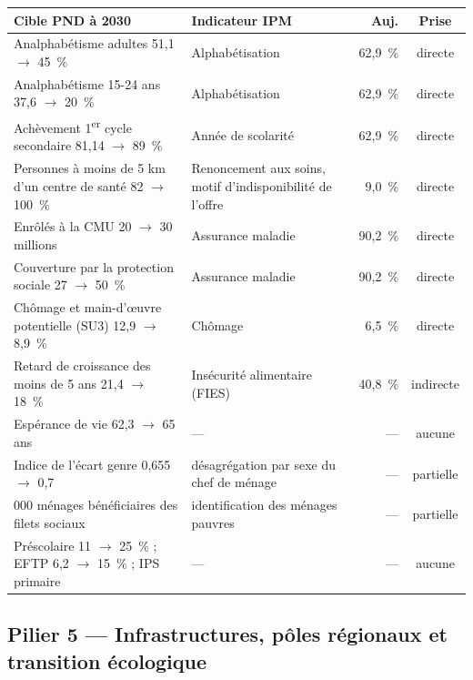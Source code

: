 \documentclass[11pt,a4paper]{article}
\begin{document}
\begin{center}
\small
\begin{tabular}{@{}>{\RaggedRight}p{5.3cm}>{\RaggedRight}p{4.6cm}rc@{}}
\toprule
\textbf{Cible PND à 2030} & \textbf{Indicateur IPM} & \textbf{Auj.} & \textbf{Prise} \\
\midrule
Analphabétisme adultes 51,1 $\to$ 45~\% & Alphabétisation & 62,9~\% & directe \\
Analphabétisme 15-24 ans 37,6 $\to$ 20~\% & Alphabétisation & 62,9~\% & directe \\
Achèvement 1\textsuperscript{er} cycle secondaire
  81,14 $\to$ 89~\% & Année de scolarité & 62,9~\% & directe \\
Personnes à moins de 5 km d'un centre de santé 82 $\to$ 100~\% &
  Renoncement aux soins, motif d'indisponibilité de l'offre & 9,0~\% & directe \\
Enrôlés à la CMU 20 $\to$ 30 millions & Assurance maladie & 90,2~\% & directe \\
Couverture par la protection sociale 27 $\to$ 50~\% & Assurance maladie & 90,2~\% & directe \\
Chômage et main-d'œuvre potentielle (SU3) 12,9 $\to$ 8,9~\% & Chômage & 6,5~\% & directe \\
Retard de croissance des moins de 5 ans 21,4 $\to$ 18~\% &
  Insécurité alimentaire (FIES) & 40,8~\% & indirecte \\
Espérance de vie 62,3 $\to$ 65 ans & --- & --- & aucune \\
Indice de l'écart genre 0,655 $\to$ 0,7 &
  désagrégation par sexe du chef de ménage & --- & partielle \\
827 000 ménages bénéficiaires des filets sociaux &
  identification des ménages pauvres & --- & partielle \\
Préscolaire 11 $\to$ 25~\% ; EFTP 6,2 $\to$ 15~\% ; IPS primaire & --- & --- & aucune \\
\bottomrule
\end{tabular}
\end{center}

\subsection{Pilier 5 --- Infrastructures, pôles régionaux et transition écologique}
\end{document}
